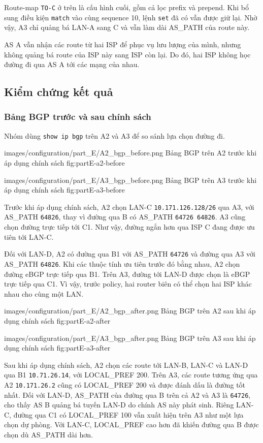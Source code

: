 Route-map \texttt{TO-C} ở trên là cấu hình cuối,
gồm cả lọc prefix và prepend.
Khi bổ sung điều kiện \texttt{match}
vào cùng sequence 10, lệnh \texttt{set}
đã có vẫn được giữ lại.
Nhờ vậy, A3 chỉ quảng bá LAN-A sang C
và vẫn làm dài AS\_PATH của route này.

AS A vẫn nhận các route từ hai ISP
để phục vụ lưu lượng của mình,
nhưng không quảng bá route của ISP này
sang ISP còn lại.
Do đó, hai ISP không học đường đi
qua AS A tới các mạng của nhau.

\subsection{Kiểm chứng kết quả}

\subsubsection{Bảng BGP trước và sau chính sách}

Nhóm dùng \texttt{show ip bgp} trên A2 và A3
để so sánh lựa chọn đường đi.

\partzeroimage
{images/configuration/part_E/A2_bgp_before.png}
{Bảng BGP trên A2 trước khi áp dụng chính sách}
{fig:partE-a2-before}

\partzeroimage
{images/configuration/part_E/A3_bgp_before.png}
{Bảng BGP trên A3 trước khi áp dụng chính sách}
{fig:partE-a3-before}

Trước khi áp dụng chính sách,
A2 chọn LAN-C \texttt{10.171.126.128/26}
qua A3, với AS\_PATH \texttt{64826},
thay vì đường qua B có AS\_PATH
\texttt{64726 64826}.
A3 cũng chọn đường trực tiếp tới C1.
Như vậy, đường ngắn hơn qua ISP C
đang được ưu tiên tới LAN-C.

Đối với LAN-D, A2 có đường qua B1
với AS\_PATH \texttt{64726}
và đường qua A3 với AS\_PATH \texttt{64826}.
Khi các thuộc tính ưu tiên trước đó bằng nhau,
A2 chọn đường eBGP trực tiếp qua B1.
Trên A3, đường tới LAN-D được chọn
là eBGP trực tiếp qua C1.
Vì vậy, trước policy, hai router biên
có thể chọn hai ISP khác nhau cho cùng một LAN.

\partzeroimage
{images/configuration/part_E/A2_bgp_after.png}
{Bảng BGP trên A2 sau khi áp dụng chính sách}
{fig:partE-a2-after}

\partzeroimage
{images/configuration/part_E/A3_bgp_after.png}
{Bảng BGP trên A3 sau khi áp dụng chính sách}
{fig:partE-a3-after}

Sau khi áp dụng chính sách, A2 chọn các route
tới LAN-B, LAN-C và LAN-D qua B1
\texttt{10.71.26.14}, với LOCAL\_PREF 200.
Trên A3, các route tương ứng qua A2
\texttt{10.171.26.2} cũng có LOCAL\_PREF 200
và được đánh dấu là đường tốt nhất.
Đối với LAN-D, AS\_PATH của đường qua B
trên cả A2 và A3 là \texttt{64726},
cho thấy AS B quảng bá tuyến LAN-D
do chính AS này phát sinh.
Riêng LAN-C, đường qua C1 có LOCAL\_PREF 100
vẫn xuất hiện trên A3 như một lựa chọn dự phòng.
Với LAN-C, LOCAL\_PREF cao hơn
đã khiến đường qua B được chọn
dù AS\_PATH dài hơn.

